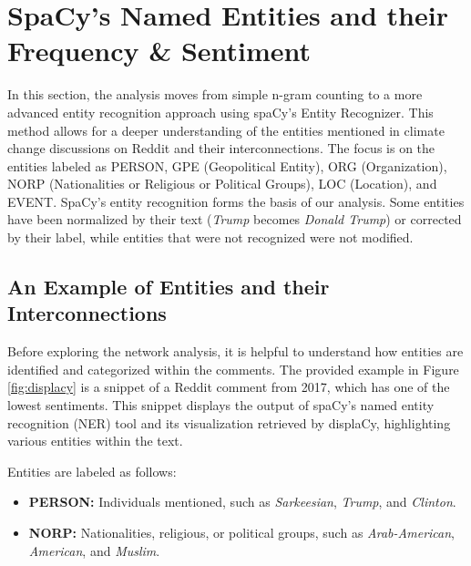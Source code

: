 \section{SpaCy's Named Entities and their Frequency \& Sentiment}
In this section, the analysis moves from simple n-gram counting to a more advanced entity recognition approach using spaCy's Entity Recognizer. This method allows for a deeper understanding of the entities mentioned in climate change discussions on Reddit and their interconnections. The focus is on the entities labeled as PERSON, GPE (Geopolitical Entity), ORG (Organization), NORP (Nationalities or Religious or Political Groups), LOC (Location), and EVENT. SpaCy's entity recognition forms the basis of our analysis. Some entities have been normalized by their text (\emph{Trump} becomes \emph{Donald Trump}) or corrected by their label, while entities that were not recognized were not modified.

\subsection{An Example of Entities and their Interconnections}
Before exploring the network analysis, it is helpful to understand how entities are identified and categorized within the comments. The provided example in Figure \ref{fig:displacy} is a snippet of a Reddit comment from 2017, which has one of the lowest sentiments. This snippet displays the output of spaCy's named entity recognition (NER) tool and its visualization retrieved by displaCy, highlighting various entities within the text.

Entities are labeled as follows:
\begin{itemize}
    \item \textbf{PERSON:} Individuals mentioned, such as \emph{Sarkeesian}, \emph{Trump}, and \emph{Clinton}.
    \item \textbf{NORP:} Nationalities, religious, or political groups, such as \emph{Arab-American}, \emph{American}, and \emph{Muslim}.
\end{itemize}

